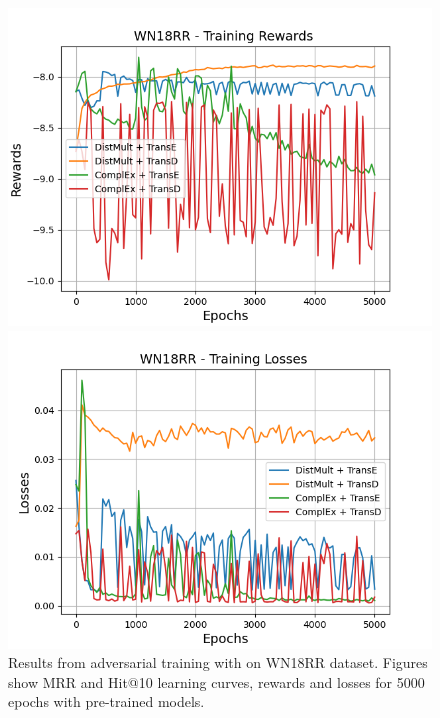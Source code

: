 \begin{figure}
    \begin{minipage}{.5\textwidth}
      \centering
      \includegraphics[width=\linewidth]{figures/results/gan_train/pretrained/uncertainty/max/entropy/wn18rr/5k_epochs/uncertainty_wn18rr_rew.png}
    \end{minipage}%
     \begin{minipage}{.5\textwidth}
      \centering
      \includegraphics[width=\linewidth]{figures/results/gan_train/pretrained/uncertainty/max/entropy/wn18rr/5k_epochs/uncertainty_wn18rr_losses.png}
    \end{minipage}%
    \caption{Results from adversarial training with \usmax on \textsc{WN18RR} dataset.
    Figures show MRR and Hit@10 learning curves, rewards and losses for 5000 epochs with pre-trained models.}
    \label{fig:gan_train_pretrained_usmax_wn18rr}
\end{figure}
